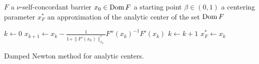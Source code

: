 \begin{algorithm}[ht]
  \begin{algorithmic}[1]
    \Require
      \Statex $F$ a $\nu$-self-concordant barrier
      \Statex $x_0 \in \operatorname{Dom} F$ a starting point
      \Statex $\beta \in (0,1)$ a centering parameter
    \Ensure
      \Statex $x^*_F$ an approximation of the analytic center of the set $\operatorname{Dom} F$
      \Statex

    \State $k \gets 0$
      \State $x_{k+1} \gets x_k - \frac{1}{1+\|F'(x_k)\|_{x_k}^*}F''(x_k)^{-1}F'(x_k)$
      \State $k \gets k + 1$
    \EndWhile
    \State \Return $x^*_F \gets x_k$

  \end{algorithmic}
  \caption{Damped Newton method for analytic centers.}
\end{algorithm}
